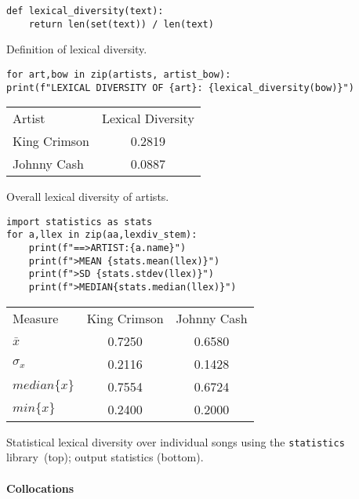 \begin{listing}[h]
\begin{verbatim}
def lexical_diversity(text):
	return len(set(text)) / len(text)
\end{verbatim}
\caption{Definition of lexical diversity.}
\label{lst:lex div}
\end{listing}

\begin{listing}[h]
	\begin{verbatim}
for art,bow in zip(artists, artist_bow):
print(f"LEXICAL DIVERSITY OF {art}: {lexical_diversity(bow)}")
	\end{verbatim}
	\centering
	\begin{tabular}{lc}
		\toprule
		Artist&Lexical Diversity\\
		\cmidrule(r){1-1}\cmidrule(l){2-2}
		King Crimson&0.2819\\
		Johnny Cash&0.0887\\
		\bottomrule
	\end{tabular}
	\caption{Overall lexical diversity of artists.}
	\label{lst:lex div overall}
\end{listing}

\begin{listing}[h]
\begin{verbatim}
import statistics as stats
for a,llex in zip(aa,lexdiv_stem):
	print(f"==>ARTIST:{a.name}")
	print(f">MEAN {stats.mean(llex)}")
	print(f">SD {stats.stdev(llex)}")
	print(f">MEDIAN{stats.median(llex)}")
\end{verbatim}
	\centering
\begin{tabular}{lcc}
	\toprule
	Measure&King Crimson&Johnny Cash\\
	\cmidrule(r){1-1}\cmidrule(lr){2-2}\cmidrule(l){3-3}
	$\bar{x}$&0.7250&0.6580\\
	$\sigma_x$&0.2116&0.1428\\
	$median\{x\}$&0.7554&0.6724\\
	$min\{x\}$&0.2400&0.2000\\
	\bottomrule
\end{tabular}
\caption{Statistical lexical diversity over individual songs using the \texttt{statistics} library~(top); output statistics (bottom).}
\label{lst:songs lex div}
\end{listing}

\paragraph{Collocations}


